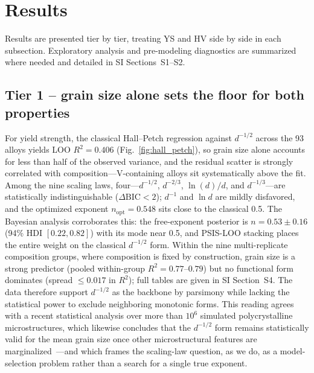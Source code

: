 \documentclass[5p,times,twocolumn]{elsarticle}
\begin{document}
% 
%



\section{Results}
\label{sec:results}

Results are presented tier by tier, treating YS and HV side by side in each subsection.
Exploratory analysis and pre-modeling diagnostics are summarized where needed and detailed in SI Sections~S1--S2.

\subsection{Tier 1 -- grain size alone sets the floor for both properties}
\label{sec:tier1}

For yield strength, the classical Hall--Petch regression against $d^{-1/2}$ across the 93 alloys yields LOO $R^2 = 0.406$ (Fig.~\ref{fig:hall_petch}), so grain size alone accounts for less than half of the observed variance, and the residual scatter is strongly correlated with composition---V-containing alloys sit systematically above the fit. Among the nine scaling laws, four---$d^{-1/2}$, $d^{-2/3}$, $\ln(d)/d$, and $d^{-1/3}$---are statistically indistinguishable ($\Delta\text{BIC} < 2$); $d^{-1}$ and $\ln d$ are mildly disfavored, and the optimized exponent $n_\text{opt} = 0.548$ sits close to the classical 0.5. The Bayesian analysis corroborates this: the free-exponent posterior is $n = 0.53 \pm 0.16$ (94\% HDI $[0.22, 0.82]$) with its mode near 0.5, and PSIS-LOO stacking places the entire weight on the classical $d^{-1/2}$ form. Within the nine multi-replicate composition groups, where composition is fixed by construction, grain size is a strong predictor (pooled within-group $R^2 = 0.77$--$0.79$) but no functional form dominates (spread $\leq 0.017$ in $R^2$); full tables are given in SI Section~S4. The data therefore support $d^{-1/2}$ as the backbone by parsimony while lacking the statistical power to exclude neighboring monotonic forms. This reading agrees with a recent statistical analysis over more than $10^6$ simulated polycrystalline microstructures, which likewise concludes that the $d^{-1/2}$ form remains statistically valid for the mean grain size once other microstructural features are marginalized~\cite{Gu2024}---and which frames the scaling-law question, as we do, as a model-selection problem rather than a search for a single true exponent.
\end{document}

